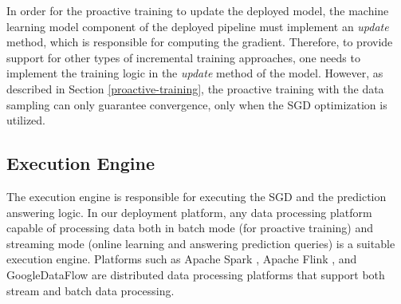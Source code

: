 In order for the proactive training to update the deployed model, the machine learning model component of the deployed pipeline must implement an \textit{update} method, which is responsible for computing the gradient.
Therefore, to provide support for other types of incremental training approaches, one needs to implement the training logic in the \textit{update} method of the model.
However, as described in Section \ref{proactive-training}, the proactive training with the data sampling can only guarantee convergence, only when the SGD optimization is utilized.


\subsection{Execution Engine}
The execution engine is responsible for executing the SGD and the prediction answering logic.
In our deployment platform, any data processing platform capable of processing data both in batch mode (for proactive training) and streaming mode (online learning and answering prediction queries) is a suitable execution engine.
Platforms such as Apache Spark \cite{zaharia2010spark}, Apache Flink \cite{carbone2015apache}, and GoogleDataFlow \cite{akidau2015dataflow} are distributed data processing platforms that support both stream and batch data processing.